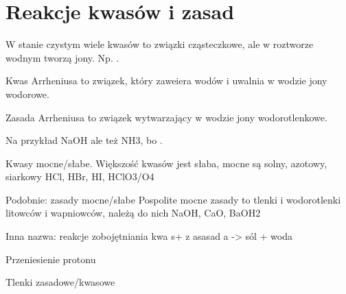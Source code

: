 \section{Reakcje kwasów i zasad}
W stanie czystym wiele kwasów to związki cząsteczkowe, ale w roztworze wodnym tworzą jony.
Np. .

Kwas Arrheniusa to związek, który zaweiera wodów i uwalnia w wodzie jony wodorowe.

Zasada Arrheniusa to związek wytwarzający w wodzie jony wodorotlenkowe.

Na przykład NaOH ale też NH3, bo .

Kwasy mocne/słabe.
Większość kwasów jest słaba, mocne są solny, azotowy, siarkowy
HCl, HBr, HI, HClO3/O4

Podobnie: zasady mocne/słabe
Pospolite mocne zasady to tlenki i wodorotlenki litowców i wapniowców, należą do nich NaOH, CaO, BaOH2

Inna nazwa: reakcje zobojętniania
kwa s+ z asasad a -> sól + woda

Przeniesienie protonu

Tlenki zasadowe/kwasowe